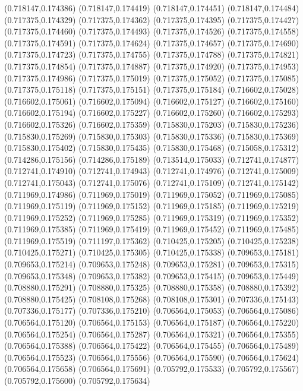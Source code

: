 (0.718147,0.174386)
(0.718147,0.174419)
(0.718147,0.174451)
(0.718147,0.174484)
(0.717375,0.174329)
(0.717375,0.174362)
(0.717375,0.174395)
(0.717375,0.174427)
(0.717375,0.174460)
(0.717375,0.174493)
(0.717375,0.174526)
(0.717375,0.174558)
(0.717375,0.174591)
(0.717375,0.174624)
(0.717375,0.174657)
(0.717375,0.174690)
(0.717375,0.174723)
(0.717375,0.174755)
(0.717375,0.174788)
(0.717375,0.174821)
(0.717375,0.174854)
(0.717375,0.174887)
(0.717375,0.174920)
(0.717375,0.174953)
(0.717375,0.174986)
(0.717375,0.175019)
(0.717375,0.175052)
(0.717375,0.175085)
(0.717375,0.175118)
(0.717375,0.175151)
(0.717375,0.175184)
(0.716602,0.175028)
(0.716602,0.175061)
(0.716602,0.175094)
(0.716602,0.175127)
(0.716602,0.175160)
(0.716602,0.175194)
(0.716602,0.175227)
(0.716602,0.175260)
(0.716602,0.175293)
(0.716602,0.175326)
(0.716602,0.175359)
(0.715830,0.175203)
(0.715830,0.175236)
(0.715830,0.175269)
(0.715830,0.175303)
(0.715830,0.175336)
(0.715830,0.175369)
(0.715830,0.175402)
(0.715830,0.175435)
(0.715830,0.175468)
(0.715058,0.175312)
(0.714286,0.175156)
(0.714286,0.175189)
(0.713514,0.175033)
(0.712741,0.174877)
(0.712741,0.174910)
(0.712741,0.174943)
(0.712741,0.174976)
(0.712741,0.175009)
(0.712741,0.175043)
(0.712741,0.175076)
(0.712741,0.175109)
(0.712741,0.175142)
(0.711969,0.174986)
(0.711969,0.175019)
(0.711969,0.175052)
(0.711969,0.175085)
(0.711969,0.175119)
(0.711969,0.175152)
(0.711969,0.175185)
(0.711969,0.175219)
(0.711969,0.175252)
(0.711969,0.175285)
(0.711969,0.175319)
(0.711969,0.175352)
(0.711969,0.175385)
(0.711969,0.175419)
(0.711969,0.175452)
(0.711969,0.175485)
(0.711969,0.175519)
(0.711197,0.175362)
(0.710425,0.175205)
(0.710425,0.175238)
(0.710425,0.175271)
(0.710425,0.175305)
(0.710425,0.175338)
(0.709653,0.175181)
(0.709653,0.175214)
(0.709653,0.175248)
(0.709653,0.175281)
(0.709653,0.175315)
(0.709653,0.175348)
(0.709653,0.175382)
(0.709653,0.175415)
(0.709653,0.175449)
(0.708880,0.175291)
(0.708880,0.175325)
(0.708880,0.175358)
(0.708880,0.175392)
(0.708880,0.175425)
(0.708108,0.175268)
(0.708108,0.175301)
(0.707336,0.175143)
(0.707336,0.175177)
(0.707336,0.175210)
(0.706564,0.175053)
(0.706564,0.175086)
(0.706564,0.175120)
(0.706564,0.175153)
(0.706564,0.175187)
(0.706564,0.175220)
(0.706564,0.175254)
(0.706564,0.175287)
(0.706564,0.175321)
(0.706564,0.175355)
(0.706564,0.175388)
(0.706564,0.175422)
(0.706564,0.175455)
(0.706564,0.175489)
(0.706564,0.175523)
(0.706564,0.175556)
(0.706564,0.175590)
(0.706564,0.175624)
(0.706564,0.175658)
(0.706564,0.175691)
(0.705792,0.175533)
(0.705792,0.175567)
(0.705792,0.175600)
(0.705792,0.175634)
